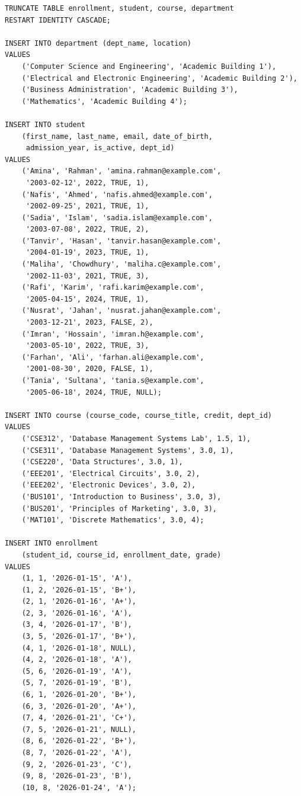 \documentclass[12pt,a4paper]{article}
\begin{document}
\begin{verbatim}
TRUNCATE TABLE enrollment, student, course, department
RESTART IDENTITY CASCADE;

INSERT INTO department (dept_name, location)
VALUES
    ('Computer Science and Engineering', 'Academic Building 1'),
    ('Electrical and Electronic Engineering', 'Academic Building 2'),
    ('Business Administration', 'Academic Building 3'),
    ('Mathematics', 'Academic Building 4');

INSERT INTO student
    (first_name, last_name, email, date_of_birth,
     admission_year, is_active, dept_id)
VALUES
    ('Amina', 'Rahman', 'amina.rahman@example.com',
     '2003-02-12', 2022, TRUE, 1),
    ('Nafis', 'Ahmed', 'nafis.ahmed@example.com',
     '2002-09-25', 2021, TRUE, 1),
    ('Sadia', 'Islam', 'sadia.islam@example.com',
     '2003-07-08', 2022, TRUE, 2),
    ('Tanvir', 'Hasan', 'tanvir.hasan@example.com',
     '2004-01-19', 2023, TRUE, 1),
    ('Maliha', 'Chowdhury', 'maliha.c@example.com',
     '2002-11-03', 2021, TRUE, 3),
    ('Rafi', 'Karim', 'rafi.karim@example.com',
     '2005-04-15', 2024, TRUE, 1),
    ('Nusrat', 'Jahan', 'nusrat.jahan@example.com',
     '2003-12-21', 2023, FALSE, 2),
    ('Imran', 'Hossain', 'imran.h@example.com',
     '2003-05-10', 2022, TRUE, 3),
    ('Farhan', 'Ali', 'farhan.ali@example.com',
     '2001-08-30', 2020, FALSE, 1),
    ('Tania', 'Sultana', 'tania.s@example.com',
     '2005-06-18', 2024, TRUE, NULL);

INSERT INTO course (course_code, course_title, credit, dept_id)
VALUES
    ('CSE312', 'Database Management Systems Lab', 1.5, 1),
    ('CSE311', 'Database Management Systems', 3.0, 1),
    ('CSE220', 'Data Structures', 3.0, 1),
    ('EEE201', 'Electrical Circuits', 3.0, 2),
    ('EEE202', 'Electronic Devices', 3.0, 2),
    ('BUS101', 'Introduction to Business', 3.0, 3),
    ('BUS201', 'Principles of Marketing', 3.0, 3),
    ('MAT101', 'Discrete Mathematics', 3.0, 4);

INSERT INTO enrollment
    (student_id, course_id, enrollment_date, grade)
VALUES
    (1, 1, '2026-01-15', 'A'),
    (1, 2, '2026-01-15', 'B+'),
    (2, 1, '2026-01-16', 'A+'),
    (2, 3, '2026-01-16', 'A'),
    (3, 4, '2026-01-17', 'B'),
    (3, 5, '2026-01-17', 'B+'),
    (4, 1, '2026-01-18', NULL),
    (4, 2, '2026-01-18', 'A'),
    (5, 6, '2026-01-19', 'A'),
    (5, 7, '2026-01-19', 'B'),
    (6, 1, '2026-01-20', 'B+'),
    (6, 3, '2026-01-20', 'A+'),
    (7, 4, '2026-01-21', 'C+'),
    (7, 5, '2026-01-21', NULL),
    (8, 6, '2026-01-22', 'B+'),
    (8, 7, '2026-01-22', 'A'),
    (9, 2, '2026-01-23', 'C'),
    (9, 8, '2026-01-23', 'B'),
    (10, 8, '2026-01-24', 'A');
\end{verbatim}
\end{document}
